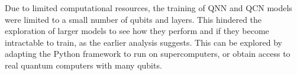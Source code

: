 Due to limited computational resources, the training of QNN and QCN models were limited to a small number of qubits and layers. This hindered the exploration of larger models to see how they perform and if they become intractable to train, as the earlier analysis suggests. This can be explored by adapting the Python framework to run on supercomputers, or obtain access to real quantum computers with many qubits.



